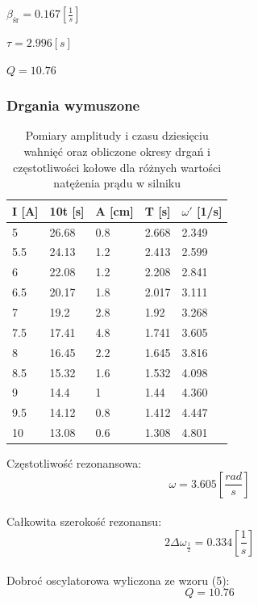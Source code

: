 \documentclass[]{article}
\begin{document}
	$\beta_{\text{śr}} = 0.167 \left[ \frac{1}{s}\right] $
	
	$\tau=2.996[s]$
	
	$Q = 10.76$
	
	\subsubsection{Drgania wymuszone}
	
	\begin{table}[h]
		\centering
		\caption{Pomiary amplitudy i czasu dziesięciu wahnięć oraz obliczone okresy drgań i częstotliwości kołowe dla różnych wartości natężenia prądu w silniku}
		\begin{tabular}{|l|l|l|l|l|}
			\hline
			
			I [A] & 10t [s] & A [cm] & T [s] & $\omega'$ [1/s] \\ \hline
			5 & 26.68 & 0.8 & 2.668 & 2.349 \\ \hline
			5.5 & 24.13 & 1.2 & 2.413 & 2.599 \\ \hline
			6 & 22.08 & 1.2 & 2.208 & 2.841 \\ \hline
			6.5 & 20.17 & 1.8 & 2.017 & 3.111 \\ \hline
			7 & 19.2 & 2.8 & 1.92 & 3.268 \\ \hline
			7.5 & 17.41 & 4.8 & 1.741 & 3.605 \\ \hline
			8 & 16.45 & 2.2 & 1.645 & 3.816 \\ \hline
			8.5 & 15.32 & 1.6 & 1.532 & 4.098 \\ \hline
			9 & 14.4 & 1 & 1.44 & 4.360 \\ \hline
			9.5 & 14.12 & 0.8 & 1.412 & 4.447 \\ \hline
			10 & 13.08 & 0.6 & 1.308 & 4.801 \\ \hline
			
		\end{tabular}
	\end{table}
	
	Częstotliwość rezonansowa:
	$$\omega = 3.605 \left[ \frac{rad}{s}\right]$$\\
	Całkowita szerokość rezonansu:
	$$2\Delta\omega_{\frac{1}{2}} = 0.334 \left[ \frac{1}{s}\right] $$\\	
	Dobroć oscylatorowa wyliczona ze wzoru (5):
	$$Q = 10.76$$
	
\end{document}
